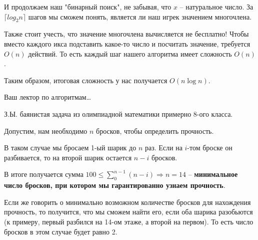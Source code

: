 \documentclass[12pt]{extreport}
\theoremstyle{definiton}
\theoremstyle{definition}
\theoremstyle{definition}
\let\leq\leqslant
\newcounter{problem}
\newcounter{subproblem}
\def\beforPRskip{
	\bigskip
}
\def\pr{\beforPRskip\noindent\stepcounter{problem}{\bf \theproblem .\;}\setcounter{subproblem}{0}}
\begin{document}
	И продолжаем наш "бинарный поиск", не забывая, что $x$ -- натуральное число. За $\lceil log_2n \rceil$ шагов мы сможем понять, является ли наш игрек значением многочлена.

	Также стоит учесть, что значение многочлена вычисляется не бесплатно! Чтобы вместо каждого икса подставить какое-то число и посчитать значение, требуется $O(n)$ действий. То есть каждый шаг нашего алгоритма имеет сложность $O(n)$.

	Таким образом, итоговая сложность у нас получается $O(n \log n)$.

\pr Ваш лектор по алгоритмам\ldots

	З.Ы. баянистая задача из олимпиадной математики примерно 8-ого класса.

	Допустим, нам необходимо $n$ бросков, чтобы определить прочность.

	В таком случае мы бросаем 1-ый шарик до $n$ раз. Если на $i$-том броске он разбивается, то на второй шарик остается $n-i$ бросков.

	В итоге получается сумма $100 \leq \sum_0^{n-1} (n - i) \Rightarrow n = 14$ -- \textbf{минимальное число бросков, при котором мы гарантированно узнаем прочность}.

	Если же говорить о минимально возможном количестве бросков для нахождения прочность, то получится, что мы сможем найти его, если оба шарика разобьются (к примеру, первый разбился на 14-ом этаже, а второй на первом).
	То есть число бросков в этом случае будет равно 2.
\end{document}
